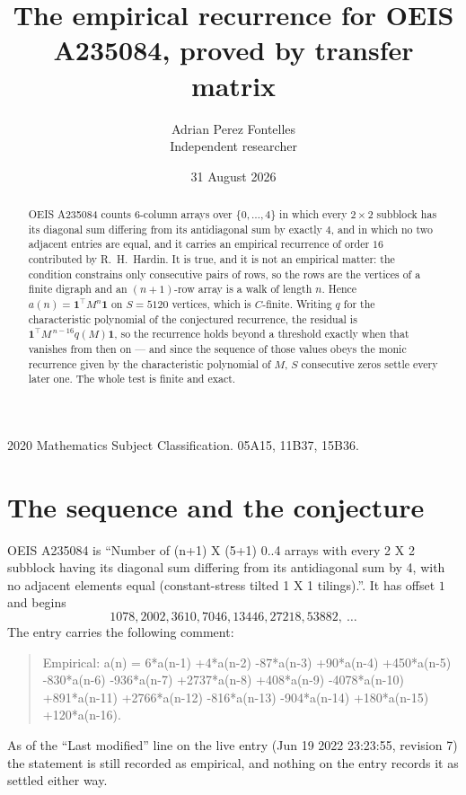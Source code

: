 \documentclass[11pt,a4paper]{article}
\title{The empirical recurrence for OEIS A235084, proved by transfer matrix}
\author{Adrian Perez Fontelles\\ \small Independent researcher}
\date{31 August 2026}
\theoremstyle{plain}
\theoremstyle{definition}
\begin{document}
\maketitle

\begin{abstract}
OEIS A235084 counts $6$-column arrays over $\{0,\dots,4\}$ in which every
$2\times2$ subblock has its diagonal sum differing from its antidiagonal sum by
exactly $4$, and in which no two adjacent entries are equal, and it
carries an empirical recurrence of order $16$ contributed by R.~H.~Hardin. It is true,
and it is not an empirical matter: the condition constrains only consecutive pairs of rows,
so the rows are the vertices of a finite digraph and an $(n+1)$-row array is a walk of
length $n$. Hence $a(n)=\mathbf{1}^{\!\top}M^{n}\mathbf{1}$ on $S=5120$ vertices, which
is $C$-finite. Writing $q$ for the characteristic polynomial of the conjectured recurrence,
the residual is $\mathbf{1}^{\!\top}M^{\,n-16}q(M)\mathbf{1}$, so the recurrence
holds beyond a threshold exactly when that vanishes from then on --- and since the sequence
of those values obeys the monic recurrence given by the characteristic polynomial of $M$,
$S$ consecutive zeros settle every later one. The whole test is finite and exact.
\end{abstract}

\noindent\small 2020 Mathematics Subject Classification. 05A15, 11B37, 15B36.\normalsize

\section{The sequence and the conjecture}

OEIS A235084 is ``Number of (n+1) X (5+1) 0..4 arrays with every 2 X 2 subblock having its diagonal sum differing from its antidiagonal sum by 4, with no adjacent elements equal (constant-stress tilted 1 X 1 tilings).''. It has offset
$1$ and begins
\[
1078, 2002, 3610, 7046, 13446, 27218, 53882,\ \dots
\]
The entry carries the following comment:
\begin{quote}\small
Empirical: a(n) = 6*a(n-1) +4*a(n-2) -87*a(n-3) +90*a(n-4) +450*a(n-5) -830*a(n-6) -936*a(n-7) +2737*a(n-8) +408*a(n-9) -4078*a(n-10) +891*a(n-11) +2766*a(n-12) -816*a(n-13) -904*a(n-14) +180*a(n-15) +120*a(n-16).
\end{quote}
As of the ``Last modified'' line on the live entry (Jun 19 2022 23:23:55, revision 7) the statement is
still recorded as empirical, and nothing on the entry records it as settled either way.
\end{document}
